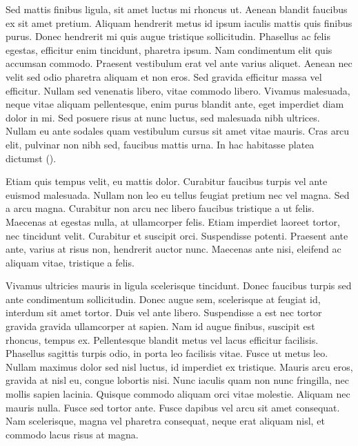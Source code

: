 \begin{refsection}
Sed mattis finibus ligula, sit amet luctus mi rhoncus ut. Aenean blandit faucibus ex sit amet pretium. Aliquam hendrerit metus id ipsum iaculis mattis quis finibus purus. Donec hendrerit mi quis augue tristique sollicitudin. Phasellus ac felis egestas, efficitur enim tincidunt, pharetra ipsum. Nam condimentum elit quis accumsan commodo. Praesent vestibulum erat vel ante varius aliquet. Aenean nec velit sed odio pharetra aliquam et non eros. Sed gravida efficitur massa vel efficitur. Nullam sed venenatis libero, vitae commodo libero. Vivamus malesuada, neque vitae aliquam pellentesque, enim purus blandit ante, eget imperdiet diam dolor in mi. Sed posuere risus at nunc luctus, sed malesuada nibh ultrices. Nullam eu ante sodales quam vestibulum cursus sit amet vitae mauris. Cras arcu elit, pulvinar non nibh sed, faucibus mattis urna. In hac habitasse platea dictumst (\cite*{article_key2}).

Etiam quis tempus velit, eu mattis dolor. Curabitur faucibus turpis vel ante euismod malesuada. Nullam non leo eu tellus feugiat pretium nec vel magna. Sed a arcu magna. Curabitur non arcu nec libero faucibus tristique a ut felis. Maecenas at egestas nulla, at ullamcorper felis. Etiam imperdiet laoreet tortor, nec tincidunt velit. Curabitur et suscipit orci. Suspendisse potenti. Praesent ante ante, varius at risus non, hendrerit auctor nunc. Maecenas ante nisi, eleifend ac aliquam vitae, tristique a felis.

Vivamus ultricies mauris in ligula scelerisque tincidunt. Donec faucibus turpis sed ante condimentum sollicitudin. Donec augue sem, scelerisque at feugiat id, interdum sit amet tortor. Duis vel ante libero. Suspendisse a est nec tortor gravida gravida ullamcorper at sapien. Nam id augue finibus, suscipit est rhoncus, tempus ex. Pellentesque blandit metus vel lacus efficitur facilisis.\\
Phasellus sagittis turpis odio, in porta leo facilisis vitae. Fusce ut metus leo. Nullam maximus dolor sed nisl luctus, id imperdiet ex tristique. Mauris arcu eros, gravida at nisl eu, congue lobortis nisi. Nunc iaculis quam non nunc fringilla, nec mollis sapien lacinia. Quisque commodo aliquam orci vitae molestie. Aliquam nec mauris nulla. Fusce sed tortor ante. Fusce dapibus vel arcu sit amet consequat. Nam scelerisque, magna vel pharetra consequat, neque erat aliquam nisl, et commodo lacus risus at magna.



\end{refsection}
